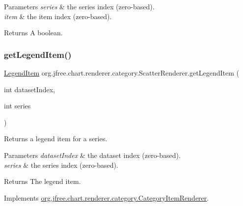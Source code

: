 \begin{DoxyParams}{Parameters}
{\em series} & the series index (zero-\/based). \\
\hline
{\em item} & the item index (zero-\/based). \\
\hline
\end{DoxyParams}
\begin{DoxyReturn}{Returns}
A boolean. 
\end{DoxyReturn}
\mbox{\label{classorg_1_1jfree_1_1chart_1_1renderer_1_1category_1_1_scatter_renderer_a5a81b3c8d6be05405e982aab9d5cbd2d}} 
\subsubsection{\texorpdfstring{get\+Legend\+Item()}{getLegendItem()}}
{\footnotesize\ttfamily \mbox{\hyperlink{classorg_1_1jfree_1_1chart_1_1_legend_item}{Legend\+Item}} org.\+jfree.\+chart.\+renderer.\+category.\+Scatter\+Renderer.\+get\+Legend\+Item (\begin{DoxyParamCaption}\item[{int}]{dataset\+Index,  }\item[{int}]{series }\end{DoxyParamCaption})}

Returns a legend item for a series.


\begin{DoxyParams}{Parameters}
{\em dataset\+Index} & the dataset index (zero-\/based). \\
\hline
{\em series} & the series index (zero-\/based).\\
\hline
\end{DoxyParams}
\begin{DoxyReturn}{Returns}
The legend item. 
\end{DoxyReturn}


Implements \mbox{\hyperlink{interfaceorg_1_1jfree_1_1chart_1_1renderer_1_1category_1_1_category_item_renderer_ab9269f34c8b4859211e4f4472636c93c}{org.\+jfree.\+chart.\+renderer.\+category.\+Category\+Item\+Renderer}}.

